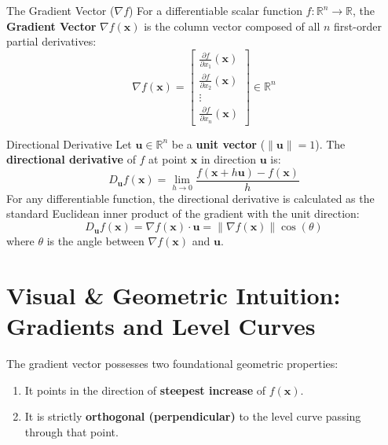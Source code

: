 \begin{definitionbox}{The Gradient Vector ($\nabla f$)}
For a differentiable scalar function $f: \mathbb{R}^n \to \mathbb{R}$, the \textbf{Gradient Vector} $\nabla f(\mathbf{x})$ is the column vector composed of all $n$ first-order partial derivatives:
\begin{equation}
\nabla f(\mathbf{x}) = \begin{bmatrix} \frac{\partial f}{\partial x_1}(\mathbf{x}) \\ \frac{\partial f}{\partial x_2}(\mathbf{x}) \\ \vdots \\ \frac{\partial f}{\partial x_n}(\mathbf{x}) \end{bmatrix} \in \mathbb{R}^n
\end{equation}
\end{definitionbox}

\begin{definitionbox}{Directional Derivative}
Let $\mathbf{u} \in \mathbb{R}^n$ be a \textbf{unit vector} ($\|\mathbf{u}\| = 1$). The \textbf{directional derivative} of $f$ at point $\mathbf{x}$ in direction $\mathbf{u}$ is:
\begin{equation}
D_{\mathbf{u}} f(\mathbf{x}) = \lim_{h \to 0} \frac{f(\mathbf{x} + h\mathbf{u}) - f(\mathbf{x})}{h}
\end{equation}
For any differentiable function, the directional derivative is calculated as the standard Euclidean inner product of the gradient with the unit direction:
\begin{equation}
D_{\mathbf{u}} f(\mathbf{x}) = \nabla f(\mathbf{x}) \cdot \mathbf{u} = \|\nabla f(\mathbf{x})\| \cos(\theta)
\end{equation}
where $\theta$ is the angle between $\nabla f(\mathbf{x})$ and $\mathbf{u}$.
\end{definitionbox}

\section{Visual \& Geometric Intuition: Gradients and Level Curves}

The gradient vector possesses two foundational geometric properties:
\begin{enumerate}
    \item It points in the direction of \textbf{steepest increase} of $f(\mathbf{x})$.
    \item It is strictly \textbf{orthogonal (perpendicular)} to the level curve passing through that point.
\end{enumerate}

